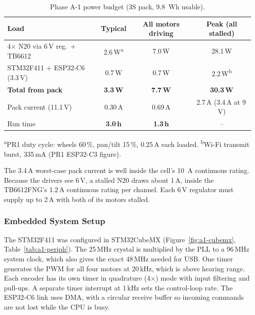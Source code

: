 \documentclass[12pt,a4paper]{article}
\begin{document}
\begin{table}[H]
\centering\small
\caption{Phase A-1 power budget (3S pack, \SI{9.8}{Wh} usable).}
\label{tab:a1-power}
\begin{tabular}{@{}lccc@{}}
\toprule
\textbf{Load} & \textbf{Typical} & \textbf{All motors driving} & \textbf{Peak (all stalled)} \\
\midrule
4$\times$ N20 via 6\,V reg.\ + TB6612 & 2.6\,W\textsuperscript{a} & 7.0\,W & 28.1\,W \\
STM32F411 + ESP32-C6 (3.3\,V) & 0.7\,W & 0.7\,W & 2.2\,W\textsuperscript{b} \\
\midrule
\textbf{Total from pack} & \textbf{3.3\,W} & \textbf{7.7\,W} & \textbf{30.3\,W} \\
Pack current (11.1\,V) & 0.30\,A & 0.69\,A & 2.7\,A (3.4\,A at 9\,V) \\
Run time & \textbf{3.0\,h} & \textbf{1.3\,h} & -- \\
\bottomrule
\end{tabular}

\smallskip
{\footnotesize \textsuperscript{a}PR1 duty cycle: wheels 60\,\%, pan/tilt 15\,\%, 0.25\,A each loaded.
\textsuperscript{b}Wi-Fi transmit burst, 335\,mA (PR1 ESP32-C3 figure).}
\end{table}

The 3.4\,A worst-case pack current is well inside the cell's \SI{10}{A}
continuous rating. Because the drivers see 6\,V, a stalled N20 draws about
1\,A, inside the TB6612FNG's 1.2\,A continuous rating per channel. Each 6\,V
regulator must supply up to 2\,A with both of its motors stalled.

\subsubsection{Embedded System Setup}

The STM32F411 was configured in STM32CubeMX (Figure~\ref{fig:a1-cubemx},
Table~\ref{tab:a1-periph}). The 25\,MHz crystal is multiplied by the PLL to a
96\,MHz system clock, which also gives the exact 48\,MHz needed for USB. One
timer generates the PWM for all four motors at 20\,kHz, which is above
hearing range. Each encoder has its own timer in quadrature (4$\times$) mode
with input filtering and pull-ups. A separate timer interrupt at 1\,kHz sets
the control-loop rate. The ESP32-C6 link uses DMA, with a circular receive
buffer so incoming commands are not lost while the CPU is busy.
\end{document}
